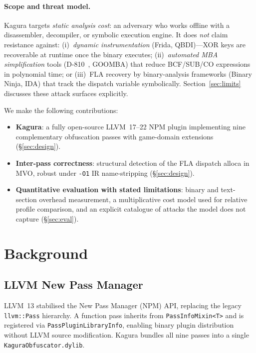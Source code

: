\documentclass[conference]{IEEEtran}
\begin{document}
\paragraph{Scope and threat model.}
Kagura targets \emph{static analysis cost}: an adversary who works
offline with a disassembler, decompiler, or symbolic execution engine.
It does \emph{not} claim resistance against:
(i)~\emph{dynamic instrumentation} (Frida, QBDI)---XOR keys are
recoverable at runtime once the binary executes;
(ii)~\emph{automated MBA simplification} tools (D-810~\cite{liu2017d810},
GOOMBA) that reduce BCF/SUB/CO expressions in polynomial time; or
(iii)~FLA recovery by binary-analysis frameworks (Binary Ninja, IDA)
that track the dispatch variable symbolically.
Section~\ref{sec:limits} discusses these attack surfaces explicitly.

We make the following contributions:
\begin{itemize}
  \item \textbf{Kagura}: a fully open-source LLVM~17--22 NPM plugin
    implementing nine complementary obfuscation passes with game-domain
    extensions (\S\ref{sec:design}).
  \item \textbf{Inter-pass correctness}: structural detection of the
    FLA dispatch alloca in MVO, robust under \texttt{-O1} IR
    name-stripping (\S\ref{sec:design}).
  \item \textbf{Quantitative evaluation with stated limitations}:
    binary and text-section overhead measurement, a multiplicative
    cost model used for relative profile comparison, and an explicit
    catalogue of attacks the model does not capture (\S\ref{sec:eval}).
\end{itemize}

\section{Background}
\label{sec:background}

\subsection{LLVM New Pass Manager}

LLVM~13 stabilised the New Pass Manager (NPM) API, replacing the
legacy \texttt{llvm::Pass} hierarchy.
A function pass inherits from \texttt{PassInfoMixin<T>} and is
registered via \texttt{PassPluginLibraryInfo}, enabling binary plugin
distribution without LLVM source modification.
Kagura bundles all nine passes into a single \texttt{KaguraObfuscator.dylib}.
\end{document}
